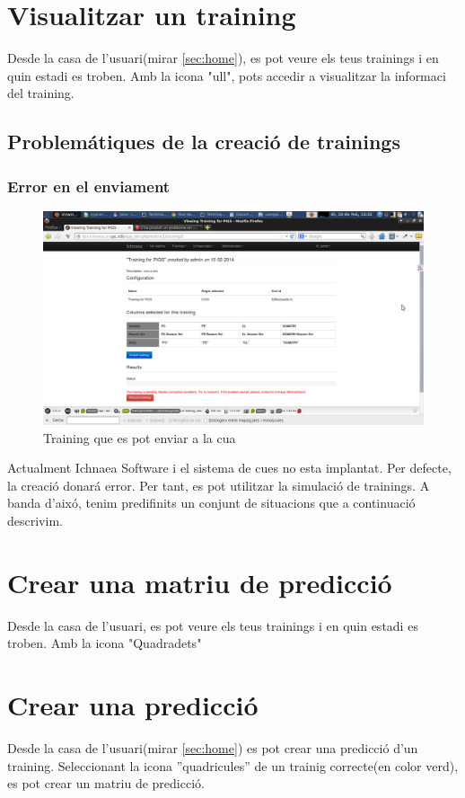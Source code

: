 \begin{itemize}
\section{Visualitzar un training}
Desde la casa de l'usuari(mirar \ref{sec:home}), es pot veure els teus trainings i en quin estadi es troben. Amb la icona "ull", pots accedir a visualitzar la informaci del training.

\subsection{Problem\'{a}tiques de la creaci\'{o} de trainings}
\subsubsection*{Error en el enviament}
\begin{figure}[h!]
  \centering
  \includegraphics[scale=0.2]{img/userguide/view_training_pending.png}
  \caption{Training que es pot enviar a la cua}
  \label{fig:placement}
\end{figure}

Actualment Ichnaea Software i el sistema de cues no esta implantat. Per defecte, la creaci\'{o} donar\'{a} error. Per tant, es pot utilitzar la simulaci\'{o} de trainings.
A banda d'aix\'{o}, tenim predifinits un conjunt de situacions que a continuaci\'{o} descrivim.

\section{Crear una matriu de predicci\'{o}}
Desde la casa de l'usuari, es pot veure els teus trainings i en quin estadi es troben. Amb la icona "Quadradets"

\section{Crear una predicci\'{o}}
Desde la casa de l'usuari(mirar \ref{sec:home}) es pot crear una predicci\'{o} d'un training. Seleccionant la icona ''quadricules'' de un trainig correcte(en color verd), es pot crear un matriu de predicci\'{o}.


\end{itemize}
